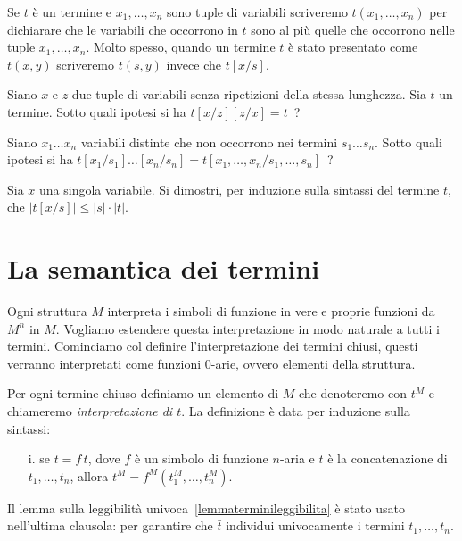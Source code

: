 Se $t$ \`e un termine e $x_1,\dots,x_n$ sono tuple di variabili scriveremo \emph{$t(x_1,\dots,x_n)$\/} per dichiarare che le variabili che occorrono in $t$ sono al pi\`u quelle che occorrono nelle tuple $x_1,\dots,x_n$. Molto spesso, quando un termine $t$ \`e stato presentato come $t(x,y)$ scriveremo \emph{$t(s,y)$\/} invece che $t[x/s]$.

\begin{exercise}\label{ex_sost_inv}
Siano $x$ e $z$ due tuple di variabili senza ripetizioni della stessa lunghezza. Sia $t$ un termine. Sotto quali ipotesi si ha $t[x/z][z/x]=t$~?
\end{exercise}

\begin{exercise}\label{lkoliuds}
Siano $x_1\dots x_n$ variabili distinte che non occorrono nei termini $s_1\dots s_n$. Sotto quali ipotesi si ha $t[x_1/s_1]\dots[x_n/s_n]=t[x_1,\dots,x_n/s_1,\dots,s_n]$~?
\end{exercise}

\begin{exercise} 
Sia $x$ una singola variabile. Si dimostri, per induzione sulla sintassi del termine $t$, che $\big|t[x/s]\big|\le |s|\cdot|t|$.
\end{exercise}


\section{La semantica dei termini}\label{interpretazionetermini}

Ogni struttura $M$ interpreta i simboli di funzione in vere e proprie funzioni da $M^n$ in $M$. Vogliamo estendere questa interpretazione in modo naturale a tutti i termini. Cominciamo col definire l'interpretazione dei termini chiusi, questi verranno interpretati come funzioni $0$-arie, ovvero elementi della struttura.

\begin{definition}\label{defterminiinterpretazione}
Per ogni termine chiuso definiamo un elemento di $M$ che denoteremo con \emph{$t^M$} e chiameremo \emph{interpretazione di $t$}. La definizione \`e data per induzione sulla sintassi:

\begin{itemize}
\item[i.] se $t=f\,\bar t$, dove $f$ \`e un simbolo di funzione $n$-aria e $\bar t$ \`e la concatenazione di $t_1,\dots,t_n$, allora $t^M=f^M(t^M_1, \dots, t^M_n)$.
\end{itemize}
Il lemma sulla leggibilit\`a univoca~\ref{lemmaterminileggibilita} \`e stato usato nell'ultima clausola: per garantire che $\bar t$ individui univocamente i termini $t_1, \dots, t_n$.\QED
\end{definition}

